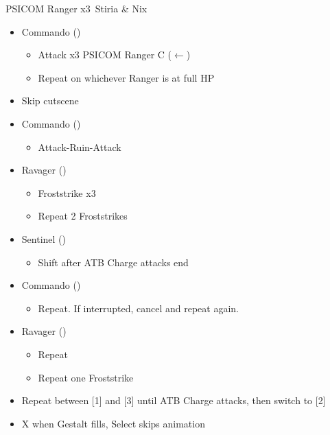 
\renewcommand{\first}{[1] Commando (\com)}
\renewcommand{\second}{[2] Sentinel (\sen)}
\renewcommand{\third}{[3] Ravager (\rav)}

\begin{battle}[0:55]{PSICOM Ranger x3\, Stiria \& Nix}
	\begin{itemize}
		\item \first
		      \begin{itemize}
			      \item Attack x3 PSICOM Ranger C ($\leftarrow$)
			      \item Repeat on whichever Ranger is at full HP
		      \end{itemize}
		\item Skip cutscene
		\item \first
		      \begin{itemize}
			      \item Attack-Ruin-Attack
		      \end{itemize}
		\item \third
		      \begin{itemize}
			      \item Froststrike x3
			      \item Repeat 2 Froststrikes
		      \end{itemize}
		\item \second
		      \begin{itemize}
			      \item Shift after ATB Charge attacks end
		      \end{itemize}
		\item \first
		      \begin{itemize}
			      \item Repeat. If interrupted, cancel and repeat again.
		      \end{itemize}
		\item \third
		      \begin{itemize}
			      \item Repeat
			      \item Repeat one Froststrike
		      \end{itemize}
		\item Repeat between [1] and [3] until ATB Charge attacks, then switch to [2]
		\item X when Gestalt fills, Select skips animation
	\end{itemize}
	 
\end{battle}
\vfill
\ 
\columnbreak